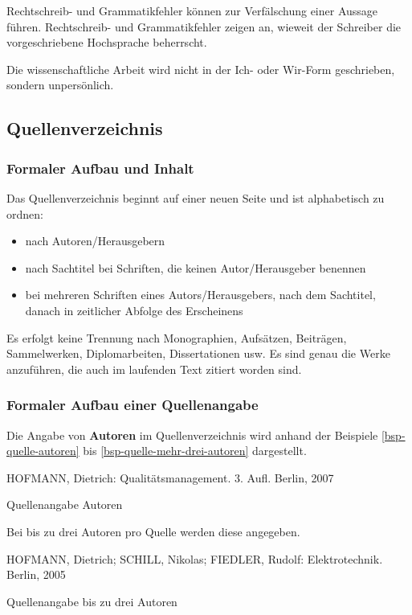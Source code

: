 Rechtschreib- und Grammatikfehler können zur Verfälschung einer Aussage führen.
Rechtschreib- und Grammatikfehler zeigen an, wieweit der Schreiber die vorgeschriebene Hochsprache beherrscht.

Die wissenschaftliche Arbeit wird nicht in der Ich- oder Wir-Form geschrieben, sondern unpersönlich.
\subsection{Quellenverzeichnis}
\label{formal-gestaltung-quellenverzeichnis}
\subsubsection{Formaler Aufbau und Inhalt}
\label{formal-gestaltung-quellenverzeichnis-inhalt}
Das Quellenverzeichnis beginnt auf einer neuen Seite und ist alphabetisch zu ordnen:
\begin{itemize}
    \item nach Autoren/Herausgebern
    \item nach Sachtitel bei Schriften, die keinen Autor/Herausgeber benennen
    \item bei mehreren Schriften eines Autors/Herausgebers, nach dem Sachtitel, danach in zeitlicher Abfolge des Erscheinens
\end{itemize}
Es erfolgt keine Trennung nach Monographien, Aufsätzen, Beiträgen, Sammelwerken, Diplomarbeiten, Dissertationen usw.
Es sind genau die Werke anzuführen, die auch im laufenden Text zitiert worden sind.

\subsubsection{Formaler Aufbau einer Quellenangabe}
\label{formal-gestaltung-quellenverzeichnis-quelle}
Die Angabe von \textbf{Autoren} im Quellenverzeichnis wird anhand der Beispiele \ref{bsp-quelle-autoren} bis \ref{bsp-quelle-mehr-drei-autoren} dargestellt.

\begin{example}[H]
    \begin{framed}
        HOFMANN, Dietrich: Qualitätsmanagement. 3. Aufl. Berlin, 2007
    \end{framed}
    \caption{Quellenangabe Autoren}
    \label{bsp-quelle-autoren}
\end{example}

Bei bis zu drei Autoren pro Quelle werden diese angegeben.

\begin{example}[H]
    \begin{framed}
        HOFMANN, Dietrich; SCHILL, Nikolas; FIEDLER, Rudolf: Elektrotechnik. Berlin, 2005
    \end{framed}
    \caption{Quellenangabe bis zu drei Autoren}
    \label{bsp-quelle-drei-autoren}
\end{example}

